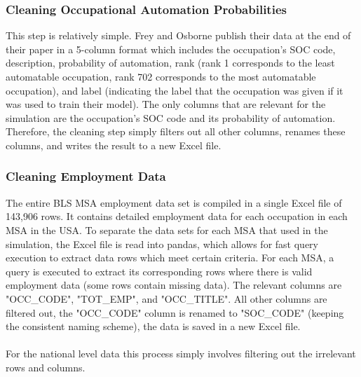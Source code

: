\documentclass[10pt]{article}
\begin{document}
\subsubsection{Cleaning Occupational Automation Probabilities}
This step is relatively simple. Frey and Osborne publish their data at the end of their paper in a 5-column format which includes the occupation's SOC code, description, probability of automation, rank (rank 1 corresponds to the least automatable occupation, rank 702 corresponds to the most automatable occupation), and label (indicating the label that the occupation was given if it was used to train their model). The only columns that are relevant for the simulation are the occupation's SOC code and its probability of automation. Therefore, the cleaning step simply filters out all other columns, renames these columns, and writes the result to a new Excel file.

\subsubsection{Cleaning Employment Data}
The entire BLS MSA employment data set is compiled in a single Excel file of 143,906 rows. It contains detailed employment data for each occupation in each MSA in the USA. To separate the data sets for each MSA that used in the simulation, the Excel file is read into pandas, which allows for fast query execution to extract data rows which meet certain criteria. For each MSA, a query is executed to extract its corresponding rows where there is valid employment data (some rows contain missing data). The relevant columns are "OCC\_CODE", "TOT\_EMP", and "OCC\_TITLE". All other columns are filtered out, the "OCC\_CODE" column is renamed to "SOC\_CODE" (keeping the consistent naming scheme), the data is saved in a new Excel file.\\\\ For the national level data this process simply involves filtering out the irrelevant rows and columns.
\end{document}
